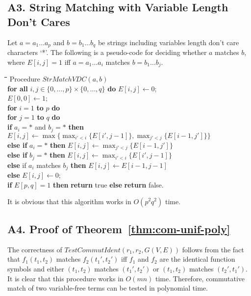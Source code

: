 \documentclass[a4paper]{llncs}
\begin{document}
\subsection*{A3. String Matching with Variable Length Don't Cares}

Let $a=a_1 \ldots a_p$ and $b=b_1 \ldots b_q$ be strings including
variables length don't care characters `*'.
The following is a pseudo-code for deciding whether $a$ matches $b$,
where $E[i,j]=1$ iff $a=a_1 \ldots a_i$ matches $b=b_1 \ldots b_j$.

\begin{rm}
\begin{tabbing}
\quad \= \quad \= \quad \= \quad \= \quad \= \quad \= \quad \= \kill
\> Procedure $StrMatchVDC(a,b)$\\
\> \> {\bf for all} $i,j \in \{0,\ldots,p\} \times \{0,\ldots,q\}$ {\bf do} 
$E[i,j] \leftarrow 0$;\\
\> \> $E[0,0] \leftarrow 1$;\\
\> \> {\bf for} $i=1$ {\bf to} $p$ {\bf do}\\
\> \> \> {\bf for} $j=1$ {\bf to} $q$ {\bf do}\\
\> \> \> \> {\bf if} $a_i = *$ and $b_j = *$ {\bf then}\\
\> \> \> \> \> $E[i,j] \leftarrow \max \{ \max_{i'<i} \{ E[i',j-1] \},
\max_{j'<j} \{ E[i-1,j'] \} \}$ \\
\> \> \> \> {\bf else if} $a_i=*$ {\bf then}
$E[i,j] \leftarrow \max_{j'<j} \{ E[i-1,j'] \}$\\
\> \> \> \> {\bf else if} $b_j=*$ {\bf then}
$E[i,j] \leftarrow \max_{i'<i} \{ E[i',j-1] \}$\\
\> \> \> \> {\bf else} if $a_i$ matches $b_j$ {\bf then}
$E[i,j] \leftarrow E[i-1,j-1]$\\
\> \> \> \> {\bf else} 
$E[i,j] \leftarrow 0$;\\
\> \> {\bf if} $E[p,q]=1$ {\bf then} {\bf return} true {\bf else} {\bf return} false.
\end{tabbing}
\end{rm}

It is obvious that this algorithm works in $O(p^2 q^2)$ time.

\subsection*{A4. Proof of Theorem~\ref{thm:com-unif-poly}}

The correctness of $TestCommutIdent(r_1,r_2,G(V,E))$ follows from the fact
that $f_1(t_1,t_2)$ matches $f_2(t_1',t_2')$ iff
$f_1$ and $f_2$ are the identical function symbols and
either $(t_1,t_2)$ matches $(t_1',t_2')$ or 
$(t_1,t_2)$ matches $(t_2',t_1')$.
It is clear that this procedure works in $O(mn)$ time.
Therefore, commutative match of two variable-free terms can be tested in 
polynomial time.
\end{document}
